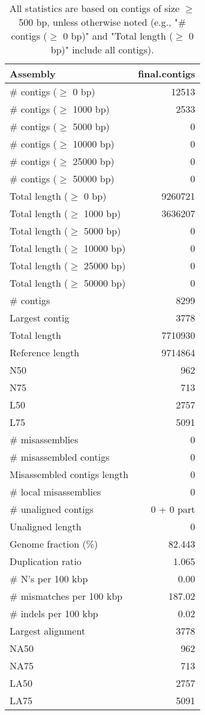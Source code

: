 \documentclass[12pt,a4paper]{article}
\begin{document}
\begin{table}[ht]
\begin{center}
\caption{All statistics are based on contigs of size $\geq$ 500 bp, unless otherwise noted (e.g., "\# contigs ($\geq$ 0 bp)" and "Total length ($\geq$ 0 bp)" include all contigs).}
\begin{tabular}{|l*{1}{|r}|}
\hline
Assembly & final.contigs \\ \hline
\# contigs ($\geq$ 0 bp) & 12513 \\ \hline
\# contigs ($\geq$ 1000 bp) & 2533 \\ \hline
\# contigs ($\geq$ 5000 bp) & 0 \\ \hline
\# contigs ($\geq$ 10000 bp) & 0 \\ \hline
\# contigs ($\geq$ 25000 bp) & 0 \\ \hline
\# contigs ($\geq$ 50000 bp) & 0 \\ \hline
Total length ($\geq$ 0 bp) & 9260721 \\ \hline
Total length ($\geq$ 1000 bp) & 3636207 \\ \hline
Total length ($\geq$ 5000 bp) & 0 \\ \hline
Total length ($\geq$ 10000 bp) & 0 \\ \hline
Total length ($\geq$ 25000 bp) & 0 \\ \hline
Total length ($\geq$ 50000 bp) & 0 \\ \hline
\# contigs & 8299 \\ \hline
Largest contig & 3778 \\ \hline
Total length & 7710930 \\ \hline
Reference length & 9714864 \\ \hline
N50 & 962 \\ \hline
N75 & 713 \\ \hline
L50 & 2757 \\ \hline
L75 & 5091 \\ \hline
\# misassemblies & 0 \\ \hline
\# misassembled contigs & 0 \\ \hline
Misassembled contigs length & 0 \\ \hline
\# local misassemblies & 0 \\ \hline
\# unaligned contigs & 0 + 0 part \\ \hline
Unaligned length & 0 \\ \hline
Genome fraction (\%) & 82.443 \\ \hline
Duplication ratio & 1.065 \\ \hline
\# N's per 100 kbp & 0.00 \\ \hline
\# mismatches per 100 kbp & 187.02 \\ \hline
\# indels per 100 kbp & 0.02 \\ \hline
Largest alignment & 3778 \\ \hline
NA50 & 962 \\ \hline
NA75 & 713 \\ \hline
LA50 & 2757 \\ \hline
LA75 & 5091 \\ \hline
\end{tabular}
\end{center}
\end{table}
\end{document}
